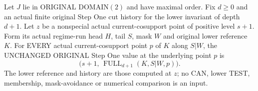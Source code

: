 \begin{theorem}
\label{hir:original-finite-cut-positive-fixed-lower-value}
\leanok
Let $J$ lie in ORIGINAL DOMAIN$(2)$ and have maximal order. Fix $d\ge0$
and an actual finite original Step One cut history for the lower invariant
of depth $d+1$. Let $z$ be a nonspecial actual current-cosupport point of
positive level $s+1$. Form its actual regime-run head $H$, tail $S$, mask
$W$ and original lower reference $K$. For EVERY actual current-cosupport
point $p$ of $K$ along $S|W$, the UNCHANGED ORIGINAL Step One value at the
underlying point $p$ is
\[
 \bigl(s+1,\,\operatorname{FULL}_{d+1}(K,S|W,p)\bigr).
\]
The lower reference and history are those computed at $z$; no CAN, lower
TEST, membership, mask-avoidance or numerical comparison is an input.
\end{theorem}
